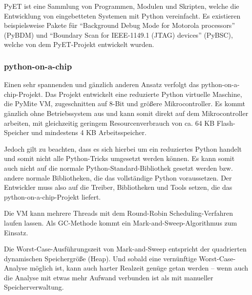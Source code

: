 PyET ist eine Sammlung von Programmen, Modulen und Skripten, welche die
Entwicklung von eingebetteten Systemen mit Python vereinfacht. Es existieren
beispielsweise Pakete für “Background Debug Mode for Motorola processors”
(PyBDM) und “Boundary Scan for IEEE-1149.1 (JTAG) devices” (PyBSC), welche
von dem PyET-Projekt entwickelt wurden.\cite{pyet}


\subsubsection{python-on-a-chip}


Einen sehr spannenden und gänzlich anderen Ansatz verfolgt das
python-on-a-chip-Projekt. Das Projekt entwickelt eine reduzierte Python
virtuelle Maschine, die PyMite VM, zugeschnitten auf 8-Bit und größere
Mikrocontroller. Es kommt gänzlich ohne Betriebssystem aus und kann somit
direkt auf dem Mikrocontroller arbeiten, mit gleichzeitig geringem
Resourcenverbrauch von ca. 64 KB Flash-Speicher und mindestens
4 KB Arbeitsspeicher.

Jedoch gilt zu beachten, dass es sich hierbei um ein reduziertes Python
handelt und somit nicht alle Python-Tricks umgesetzt werden können. Es kann
somit auch nicht auf die normale Python-Standard-Bibliothek gesetzt werden
bzw. andere normale Bibliotheken, die das vollständige Python voraussetzen.
Der Entwickler muss also auf die Treiber, Bibliotheken und Tools setzen, die
das python-on-a-chip-Projekt liefert.

Die VM kann mehrere Threads mit dem Round-Robin Scheduling-Verfahren laufen
lassen. Als GC-Methode kommt ein Mark-and-Sweep-Algorithmus zum Einsatz. \cite{p14p}

Die Worst-Case-Ausführungszeit von Mark-and-Sweep entspricht der quadrierten
dynamischen Speichergröße (Heap).\cite{sweep} Und sobald eine vernünftige
Worst-Case-Analyse möglich ist, kann auch harter Realzeit genüge getan werden
-- wenn auch die Analyse mit etwas mehr Aufwand verbunden ist als mit
manueller Speicherverwaltung.
